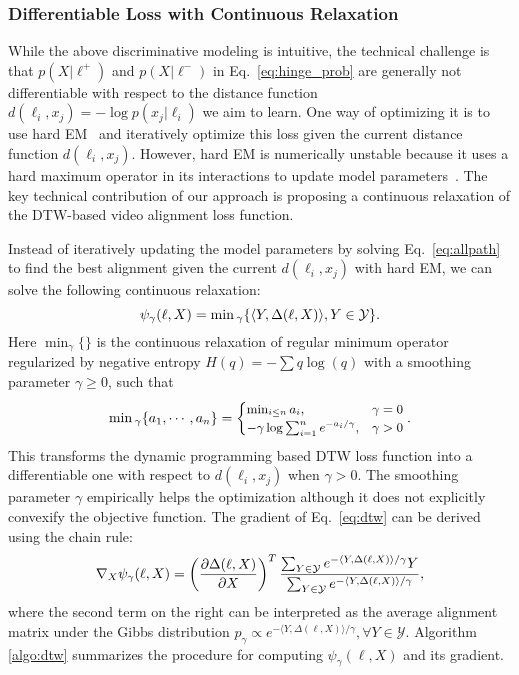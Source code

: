 \documentclass[10pt,twocolumn,letterpaper]{article}
\newcommand{\eqnref}[1]{{Eq.\ \eqref{eq:#1}}}
\begin{document}
\subsubsection{Differentiable Loss with Continuous Relaxation}
\label{sec:method_d3tw}
While the above discriminative modeling is intuitive, the technical challenge is that $p(X|\ell^+)$ and $p(X|\ell^-)$ in \eqnref{hinge_prob} are generally not differentiable with respect to the distance function $d(\ell_i, x_j)=-\log p(x_j|\ell_i)$ we aim to learn. One way of optimizing it is to use hard EM~\cite{richard2017weakly,richard2018neuralnetwork} and iteratively optimize this loss given the current distance function $d(\ell_i, x_j)$. However, hard EM is numerically unstable because it uses a hard maximum operator in its interactions to update model parameters~\cite{mensch2018differentiable}. The key technical contribution of our approach is proposing a continuous relaxation of the DTW-based video alignment loss function. 

Instead of iteratively updating the model parameters by solving \eqnref{allpath} to find the best alignment given the current $d(\ell_i, x_j)$ with hard EM, we can solve the following continuous relaxation:
\begin{equation}
\vspace{-1mm}
\small
\label{eq:dtw}
\psi_{\gamma}(\ell, X) = \min{}_{\gamma} \{\langle Y ,  \Delta (\ell, X)\rangle,  Y \in \mathcal{Y}\}.
\end{equation}
Here $\min_{\gamma}\{\}$ is the continuous relaxation of regular minimum operator regularized by negative entropy $H(q) = -\sum q \log(q)$ with a smoothing parameter $\gamma \ge 0$, such that
\begin{equation}
\vspace{-1mm}
\label{eq:softmin}
\small
\min{}_\gamma \{a_1, \cdots, a_n\} = 
    \begin{cases}
      \min_{i\le n} a_i, & \gamma=0 \\
      -\gamma \log \sum_{i=1}^n e^{-a_i/\gamma}, & \gamma > 0
    \end{cases}.
\end{equation}
This transforms the dynamic programming based DTW loss function into a differentiable one with respect to $d(\ell_i, x_j)$ when $\gamma > 0$. The smoothing parameter $\gamma$ empirically helps the optimization although it does not explicitly convexify the objective function.
The gradient of Eq.~\eqref{eq:dtw} can be derived using the chain rule:
\begin{equation}
\vspace{-1mm}
\label{eq:graddtw}
\small
\nabla_{X} \psi_{\gamma}(\ell, X) = 
\left(\frac{\partial \Delta(\ell, X)}{\partial X}\right)^T  \frac{\sum_{Y\in\mathcal{Y}} e^{-\langle Y, \Delta(\ell, X) \rangle / \gamma}Y}{\sum_{Y\in\mathcal{Y}} e^{-\langle Y, \Delta(\ell, X) \rangle / \gamma}},
\end{equation}
where the second term on the right can be interpreted as the average alignment matrix under the Gibbs distribution $p_\gamma \propto e^{-\langle Y, \Delta(\ell, X) \rangle / \gamma}, \forall Y \in \mathcal{Y}$. Algorithm \ref{algo:dtw} summarizes the procedure for computing $\psi_{\gamma}(\ell, X)$ and its gradient. 
\end{document}
